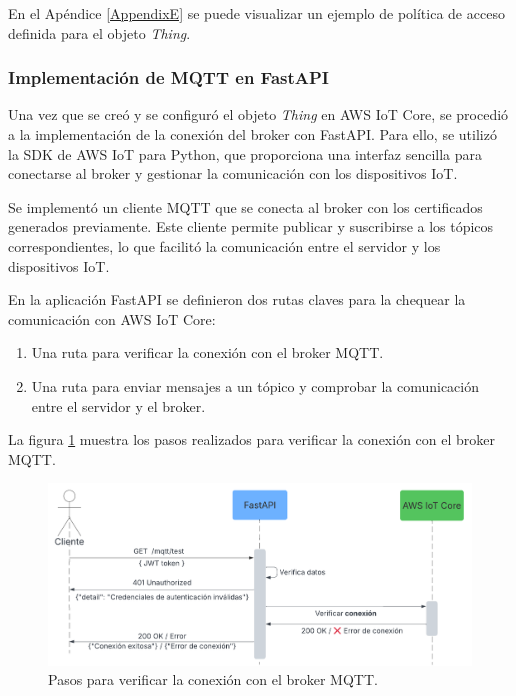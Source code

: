 En el Apéndice \ref{AppendixE} se puede visualizar un ejemplo de política de
acceso definida para el objeto \textit{Thing}.

\subsubsection{Implementación de MQTT en FastAPI}
Una vez que se creó y se configuró el objeto \textit{Thing} en AWS IoT Core, se
procedió a la implementación de la conexión del broker con FastAPI. Para ello,
se utilizó la SDK de AWS IoT para Python, que proporciona una interfaz sencilla
para conectarse al broker y gestionar la comunicación con los dispositivos IoT.

Se implementó un cliente MQTT que se conecta al broker con los certificados
generados previamente. Este cliente permite publicar y suscribirse a los
tópicos correspondientes, lo que facilitó la comunicación entre el servidor y
los dispositivos IoT.


En la aplicación FastAPI se definieron dos rutas claves para la chequear la
comunicación con AWS IoT Core:

\begin{enumerate}
    \item Una ruta para verificar la conexión con el broker MQTT.
    \item Una ruta para enviar mensajes a un tópico y comprobar la comunicación entre el
          servidor y el broker.
\end{enumerate}

La figura \ref{fig:test_mqtt} muestra los pasos realizados para verificar la
conexión con el broker MQTT.

\begin{figure}[H]
    \centering
    \includegraphics[width=.90\textwidth]{./Images/20.png}
    \caption{Pasos para verificar la conexión con el broker MQTT.}
    \label{fig:test_mqtt}
\end{figure}

